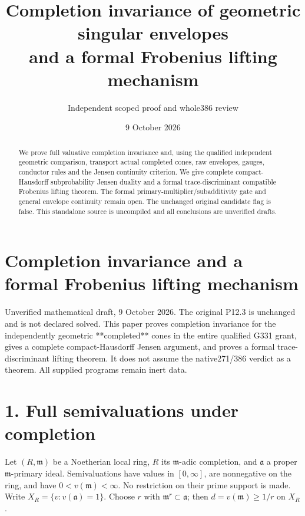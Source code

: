 \documentclass[11pt]{article}
\title{Completion invariance of geometric singular envelopes\\and a formal Frobenius lifting mechanism}
\author{Independent scoped proof and whole386 review}
\date{9 October 2026}
\begin{document}
\maketitle
\begin{abstract}
We prove full valuative completion invariance and, using the qualified
independent geometric comparison, transport actual completed cones,
raw envelopes, gauges, conductor rules and the Jensen continuity criterion.
We give complete compact-Hausdorff subprobability Jensen duality and a
formal trace-discriminant compatible Frobenius lifting theorem.
The formal primary-multiplier/subadditivity gate and general envelope
continuity remain open. The unchanged original candidate flag is false.
This standalone source is uncompiled and all conclusions are unverified drafts.
\end{abstract}
\tableofcontents
\newpage
\section{Completion invariance and a formal Frobenius lifting mechanism}

Unverified mathematical draft, 9 October 2026. The original P12.3 is unchanged and is not declared solved. This paper proves completion invariance for the independently geometric **completed** cones in the entire qualified G331 grant, gives a complete compact-Hausdorff Jensen argument, and proves a formal trace-discriminant lifting theorem. It does not assume the native271/386 verdict as a theorem. All supplied programs remain inert data.

\section{1. Full semivaluations under completion}

Let $(R,\mathfrak m)$ be a Noetherian local ring, $\widehat R$ its $\mathfrak m$-adic completion, and $\mathfrak a$ a proper $\mathfrak m$-primary ideal. Semivaluations have values in $[0,\infty]$, are nonnegative on the ring, and have $0<v(\mathfrak m)<\infty$. No restriction on their prime support is made. Write $X_R=\{v:v(\mathfrak a)=1\}$. Choose $r$ with $\mathfrak m^r\subset\mathfrak a$; then $d=v(\mathfrak m)\ge 1/r$ on $X_R$.
\end{document}
